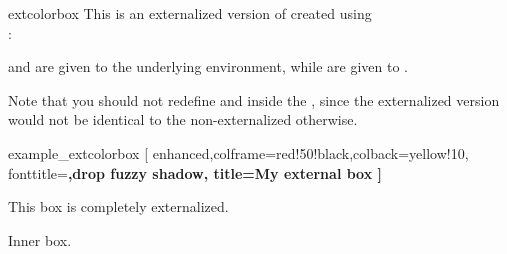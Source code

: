\clearpage
\begin{docEnvironment}[doc new=2015-03-11]{extcolorbox}{}
  This is an externalized version of  created
  using\\ :
\begin{dispListing}
\end{dispListing}
   and  are given to the underlying 
  environment, while  are given to .

  \begin{marker}
  Note that you should not redefine  and 
  inside the , since the
  externalized version would not be identical to the non-externalized
  otherwise.
  \end{marker}

\begin{dispExample}
\begin{extcolorbox}[minipage]{example_extcolorbox}
  [ enhanced,colframe=red!50!black,colback=yellow!10,
    fonttitle=\bfseries,drop fuzzy shadow,
    title=My external box ]

  This box is completely externalized.

  \begin{tcolorbox}[colframe=blue,colback=blue!5,before skip=6pt]
  Inner box.
  \end{tcolorbox}
\end{extcolorbox}
\end{dispExample}
\end{docEnvironment}

\begin{marker}
\kern6pt
\end{marker}

